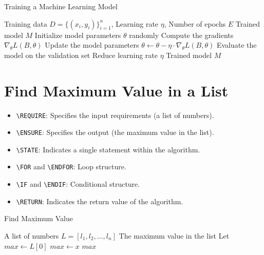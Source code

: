 \documentclass{article}
\begin{document}
	\begin{algorithm}[H]
		\caption{Training a Machine Learning Model}
		\begin{algorithmic}[1]
			\REQUIRE Training data $D = \{(x_i, y_i)\}_{i=1}^n$, Learning rate $\eta$, Number of epochs $E$
			\ENSURE Trained model $M$
			\STATE Initialize model parameters $\theta$ randomly
			\STATE Compute the gradients $\nabla_\theta L(B, \theta)$
			\STATE Update the model parameters $\theta \leftarrow \theta - \eta \cdot \nabla_\theta L(B, \theta)$
			\ENDFOR
			\STATE Evaluate the model on the validation set
			\STATE Reduce learning rate $\eta$
			\ENDIF
			\ENDFOR
			\RETURN Trained model $M$
		\end{algorithmic}
	\end{algorithm}
	
	
	
	
	\section*{Find Maximum Value in a List}
	
	\begin{itemize}
		\item \texttt{\textbackslash REQUIRE}: Specifies the input requirements (a list of numbers).
		\item \texttt{\textbackslash ENSURE}: Specifies the output (the maximum value in the list).
		\item \texttt{\textbackslash STATE}: Indicates a single statement within the algorithm.
		\item \texttt{\textbackslash FOR} and \texttt{\textbackslash ENDFOR}: Loop structure.
		\item \texttt{\textbackslash IF} and \texttt{\textbackslash ENDIF}: Conditional structure.
		\item \texttt{\textbackslash RETURN}: Indicates the return value of the algorithm.
	\end{itemize}
	
	\begin{algorithm}
		\caption{Find Maximum Value}
		\begin{algorithmic}[1]
			\REQUIRE A list of numbers $L = [l_1, l_2, \ldots, l_n]$
			\ENSURE The maximum value in the list
			\STATE Let $max \leftarrow L[0]$
			\STATE $max \leftarrow x$
			\ENDIF
			\ENDFOR
			\RETURN $max$
		\end{algorithmic}
	\end{algorithm}
	
\end{document}
